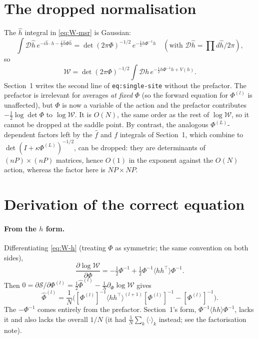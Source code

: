 \documentclass[11pt,a4paper]{article}
\newcommand{\D}{\mathcal D}
\newcommand{\W}{\mathcal W}
\newcommand{\Sact}{\mathcal S}
\begin{document}
\section{The dropped normalisation}

The $\hat h$ integral in \eqref{eq:W-msr} is Gaussian:
\begin{equation}
  \int\D\hat h\,e^{-i\hat h\cdot h - \frac12\hat h\Phi\hat h}
  = \det(2\pi\Phi)^{-1/2}\,e^{-\frac12 h\Phi^{-1}h}
  \quad(\text{with }\D\hat h = \textstyle\prod d\hat h/2\pi),
\end{equation}
so
\begin{equation}
  \W = \det(2\pi\Phi)^{-1/2}\int\D h\,e^{-\frac12h\Phi^{-1}h + V(h)}.
  \label{eq:W-h}
\end{equation}
Section~1 writes the second line of \texttt{eq:single-site} without the
prefactor. The prefactor is irrelevant for averages \emph{at fixed} $\Phi$ (so
the forward equation for $\Phi^{(l)}$ is unaffected), but $\Phi$ is now a
variable of the action and the prefactor contributes
$-\frac12\log\det\Phi$ to $\log\W$. It is $O(N)$, the same order as the rest of
$\log\W$, so it cannot be dropped at the saddle point. By contrast, the
analogous $\Phi^{(L)}$-dependent factors left by the $\hat f$ and $f$ integrals
of Section~1, which combine to $\det(I + \kappa\Phi^{(L)})^{-1/2}$, can be
dropped: they are determinants of $(nP)\times(nP)$ matrices, hence $O(1)$ in the
exponent against the $O(N)$ action, whereas the factor here is $NP\times NP$.

\section{Derivation of the correct equation}

\paragraph{From the $h$ form.} Differentiating \eqref{eq:W-h} (treating
$\Phi$ as symmetric; the same convention on both sides),
\begin{equation}
  \frac{\partial\log\W}{\partial\Phi}
  = -\tfrac12\Phi^{-1} + \tfrac12\Phi^{-1}\langle hh^\top\rangle\Phi^{-1}.
\end{equation}
Then $0 = \partial\Sact/\partial\Phi^{(l)} = \frac12\hat\Phi^{(l)} - \frac1N\partial_\Phi\log\W$ gives
\begin{equation}
  \boxed{\;\hat\Phi^{(l)} = \frac1N\Big([\Phi^{(l)}]^{-1}\langle hh^\top\rangle^{(l+1)}[\Phi^{(l)}]^{-1} - [\Phi^{(l)}]^{-1}\Big).\;}
  \label{eq:bp}
\end{equation}
The $-\Phi^{-1}$ comes entirely from the prefactor. Section~1's form,
$\Phi^{-1}\langle hh\rangle\Phi^{-1}$, lacks it and also lacks the overall $1/N$
(it had $\frac1N\sum_k\langle\cdot\rangle_k$ instead; see the factorisation note).
\end{document}
